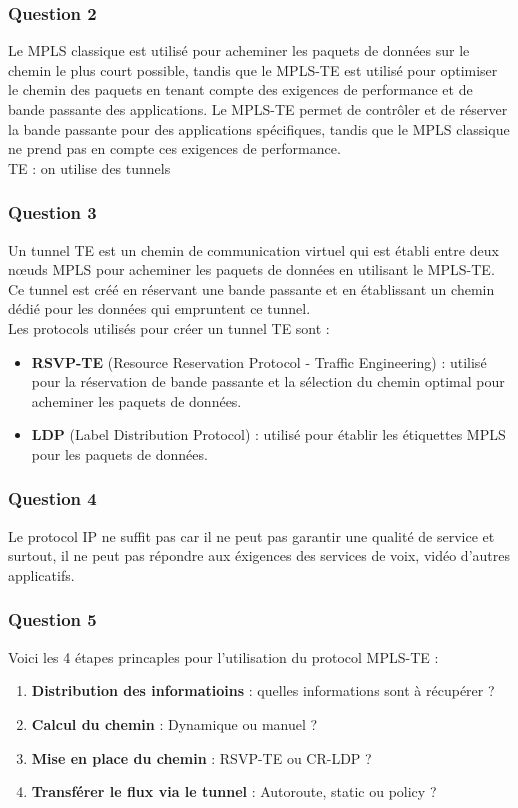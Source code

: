 \documentclass[12pt, a4paper]{article}
\begin{document}
		\subsubsection{Question 2}
		Le MPLS classique est utilisé pour acheminer les paquets de données 
		sur le chemin le plus court possible, tandis que le MPLS-TE est 
		utilisé pour optimiser le chemin des paquets en tenant compte des 
		exigences de performance et de bande passante des applications. 
		Le MPLS-TE permet de contrôler et de réserver la bande passante pour 
		des applications spécifiques, tandis que le MPLS classique ne prend
		pas en compte ces exigences de performance.\\

		TE : on utilise des tunnels 

		\subsubsection{Question 3}
		Un tunnel TE est un chemin de communication virtuel qui est établi 
		entre deux nœuds MPLS pour acheminer les paquets de données en 
		utilisant le MPLS-TE. Ce tunnel est créé en réservant une bande 
		passante et en établissant un chemin dédié pour les données qui 
		empruntent ce tunnel.\\

		Les protocols utilisés pour créer un tunnel TE sont :\\
		\begin{itemize}
			\item \textbf{RSVP-TE} (Resource Reservation Protocol - Traffic Engineering) : utilisé pour la réservation de bande passante et la sélection du chemin optimal pour acheminer les paquets de données.
			\item \textbf{LDP} (Label Distribution Protocol) : utilisé pour établir les étiquettes MPLS pour les paquets de données.
		\end{itemize}

		\newpage
		\subsubsection{Question 4}
		Le protocol IP ne suffit pas car il ne peut pas garantir une qualité
		de service et surtout, il ne peut pas répondre aux éxigences des 
		services de voix, vidéo d'autres applicatifs. 

		\subsubsection{Question 5}
		Voici les 4 étapes princaples pour l'utilisation du protocol MPLS-TE 
		: \\
		\begin{enumerate}
			\item \textbf{Distribution des informatioins} : quelles informations sont à récupérer ? 
			\item \textbf{Calcul du chemin} : Dynamique ou manuel ? 
			\item \textbf{Mise en place du chemin} : RSVP-TE ou CR-LDP ? 
			\item \textbf{Transférer le flux via le tunnel} : Autoroute, static ou policy ? 
		\end{enumerate}
\end{document}
